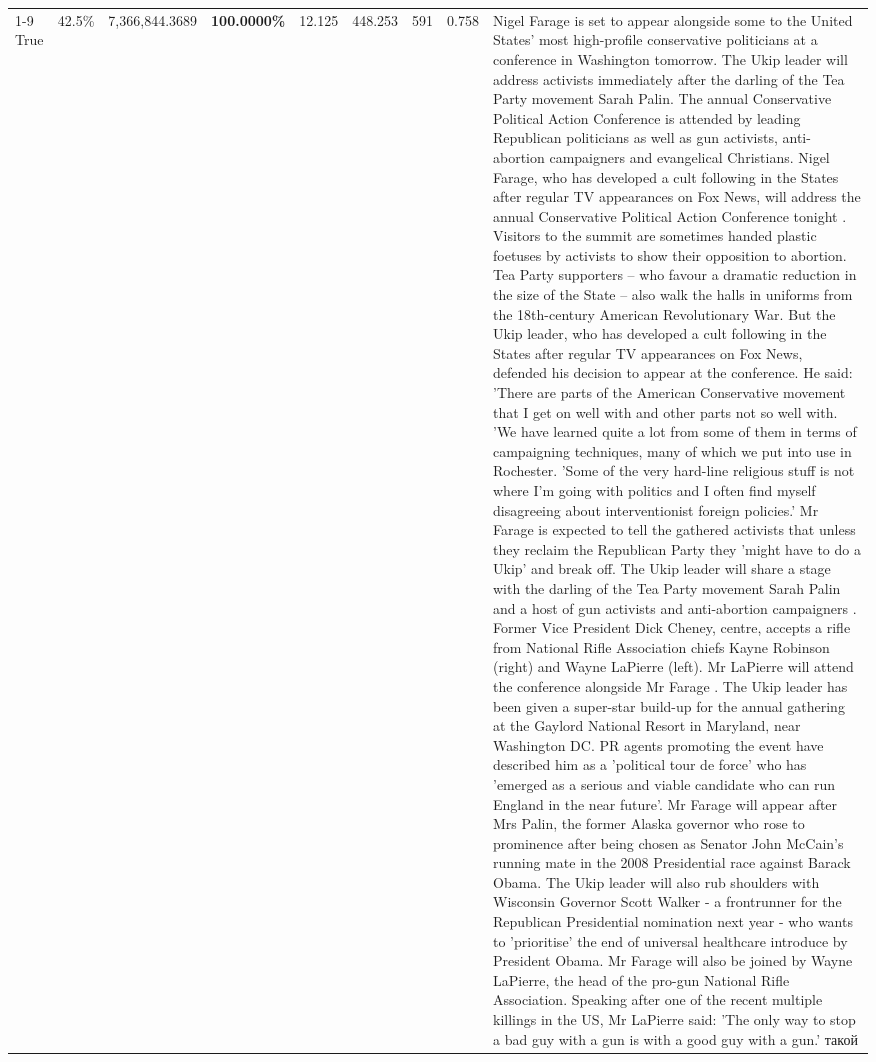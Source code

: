 \begin{table}[H]
\begin{tabular}{lllrlllll}
\cline{1-9}
True & 42.5\% & 7,366,844.3689 & \bfseries \color{red} 100.0000\% & 12.125 & 448.253 & 591 & 0.758 & Nigel Farage is set to appear alongside some to the United States' most high-profile conservative politicians at a conference in Washington tomorrow. The Ukip leader will address activists immediately after the darling of the Tea Party movement Sarah Palin. The annual Conservative Political Action Conference is attended by leading Republican politicians as well as gun activists, anti-abortion campaigners and evangelical Christians. Nigel Farage, who has developed a cult following in the States after regular TV appearances on Fox News, will address the annual Conservative Political Action Conference tonight . Visitors to the summit are sometimes handed plastic foetuses by activists to show their opposition to abortion. Tea Party supporters – who favour a dramatic reduction in the size of the State – also walk the halls in uniforms from the 18th-century American Revolutionary War. But the Ukip leader, who has developed a cult following in the States after regular TV appearances on Fox News, defended his decision to appear at the conference. He said: 'There are parts of the American Conservative movement that I get on well with and other parts not so well with. 'We have learned quite a lot from some of them in terms of campaigning techniques, many of which we put into use in Rochester. 'Some of the very hard-line religious stuff is not where I'm going with politics and I often find myself disagreeing about interventionist foreign policies.' Mr Farage is expected to tell the gathered activists that unless they reclaim the Republican Party they 'might have to do a Ukip' and break off. The Ukip leader will share a stage with the darling of the Tea Party movement Sarah Palin and a host of gun activists and anti-abortion campaigners . Former Vice President Dick Cheney, centre, accepts a rifle from National Rifle Association chiefs Kayne Robinson (right) and Wayne LaPierre (left). Mr LaPierre will attend the conference alongside Mr Farage . The Ukip leader has been given a super-star build-up for the annual gathering at the Gaylord National Resort in Maryland, near Washington DC. PR agents promoting the event have described him as a 'political tour de force' who has 'emerged as a serious and viable candidate who can run England in the near future'. Mr Farage will appear after Mrs Palin, the former Alaska governor who rose to prominence after being chosen as Senator John McCain's running mate in the 2008 Presidential race against Barack Obama. The Ukip leader will also rub shoulders with Wisconsin Governor Scott Walker - a frontrunner for the Republican Presidential nomination next year - who wants to 'prioritise' the end of universal healthcare introduce by President Obama. Mr Farage will also be joined by Wayne LaPierre, the head of the pro-gun National Rifle Association. Speaking after one of the recent multiple killings in the US, Mr LaPierre said: 'The only way to stop a bad guy with a gun is with a good guy with a gun.' такой \\

\end{tabular}
\end{table}
